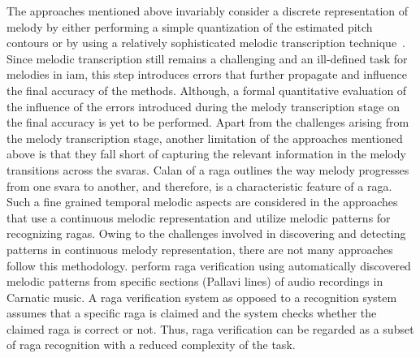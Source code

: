 {The approaches mentioned above invariably consider a discrete representation of melody by either performing a simple quantization of the estimated pitch contours or by using a relatively sophisticated melodic transcription technique~\cite{pandey2003tansen}. Since melodic transcription still remains a challenging and an ill-defined task for melodies in \gls{iam}, this step introduces errors that further propagate and influence the final accuracy of the methods. Although, a formal quantitative evaluation of the influence of the errors introduced during the melody transcription stage on the final accuracy is yet to be performed. Apart from the challenges arising from the melody transcription stage, another limitation of the approaches mentioned above is that they fall short of capturing the relevant information in the melody transitions across the \glspl{svara}. Calan of a \gls{raga} outlines the way melody progresses from one \gls{svara} to another, and therefore, is a characteristic feature of a \gls{raga}. Such a fine grained temporal melodic aspects are considered in the approaches that use a continuous melodic representation and utilize melodic patterns for recognizing \glspl{raga}. Owing to the challenges involved in discovering and detecting patterns in continuous melody representation, there are not many approaches follow this methodology. \cite{shrey_ISMIR_2015} perform \gls{raga} verification using automatically discovered melodic patterns from specific sections (Pallavi lines) of audio recordings in Carnatic music. A \gls{raga} verification system as opposed to a recognition system assumes that a specific \gls{raga} is claimed and the system checks whether the claimed \gls{raga} is correct or not. Thus, \gls{raga} verification can be regarded as a subset of \gls{raga} recognition with a reduced complexity of the task. 

}
